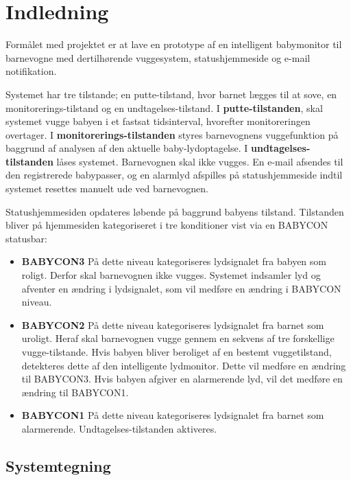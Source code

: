 \section{Indledning}

Formålet med projektet er at lave en prototype af en intelligent babymonitor til barnevogne med dertilhørende vuggesystem, statushjemmeside og e-mail notifikation.

Systemet har tre tilstande; en putte-tilstand, hvor barnet lægges til at sove, en monitorerings-tilstand og en undtagelses-tilstand.
I \textbf{putte-tilstanden}, skal systemet vugge babyen i et fastsat tidsinterval, hvorefter monitoreringen overtager.
I \textbf{monitorerings-tilstanden} styres barnevognens vuggefunktion på baggrund af analysen af den aktuelle baby-lydoptagelse.
I \textbf{undtagelses-tilstanden} låses systemet. Barnevognen skal ikke vugges. En e-mail afsendes til den registrerede babypasser, og en alarmlyd afspilles på statushjemmeside indtil systemet resettes manuelt ude ved barnevognen. 

Statushjemmesiden opdateres løbende  på baggrund babyens tilstand. Tilstanden bliver på hjemmesiden kategoriseret i tre konditioner vist via en BABYCON statusbar:
\label{kravspec:indledning_babycon_states}
\begin{itemize}
\item \textbf{BABYCON3} 
\newline På dette niveau kategoriseres lydsignalet fra babyen som roligt. Derfor skal barnevognen ikke vugges. Systemet indsamler lyd og afventer en ændring i lydsignalet, som vil medføre en ændring i BABYCON niveau. 

\item \textbf{BABYCON2}
\newline På dette niveau kategoriseres lydsignalet fra barnet som uroligt. Heraf skal barnevognen vugge gennem en sekvens af tre forskellige vugge-tilstande. Hvis babyen bliver beroliget af en bestemt vuggetilstand, detekteres dette af den intelligente lydmonitor. Dette vil medføre en ændring til BABYCON3. Hvis babyen afgiver en alarmerende lyd, vil det medføre en ændring til BABYCON1.  

\item \textbf{BABYCON1}
\newline På dette niveau kategoriseres lydsignalet fra barnet som alarmerende. Undtagelses-tilstanden aktiveres. 
\end{itemize}
 
\subsection*{Systemtegning}

